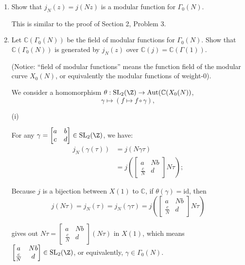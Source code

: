 \begin{enumerate}
    \item Show that $j_N(z) = j(Nz)$ is a modular function for $\Gamma_0(N)$.
    \begin{proofc}[解答]
        This is similar to the proof of Section 2, Problem 3.
    \end{proofc}

    \item Let $\mathbb{C}(\Gamma_0(N))$ be the field of modular functions for $\Gamma_0(N)$. Show that $\mathbb{C}(\Gamma_0(N))$ is generated by $j_N(z)$ over $\mathbb{C}(j) = \mathbb{C}(\Gamma(1))$.

    (Notice: ``field of modular functions'' means the function field of the modular curve $X_0(N)$, or equivalently the modular functions of weight-$0$).

     \begin{proofc}[解答]
        We consider a homomorphism $\theta: \mathrm{SL}_2(\Z) \to \mathrm{Aut}(\mathbb{C}(X_0(N))$,
        $$\gamma \mapsto (f\mapsto f \circ \gamma),$$

        (i)
        
        For any $\gamma  = \begin{bmatrix}
            a & b \\
            c & d
            \end{bmatrix} \in \mathrm{SL}_2(\Z)$, we have:
        \begin{align}
            j_N(\gamma(\tau)) &= j(N\gamma \tau) \\
            &= j(\begin{bmatrix}
                a & Nb\\
                \frac{c}{N} & d
            \end{bmatrix} N\tau);
        \end{align}

        Because $j$ is a bijection between $X(1)$ to $\mathbb{C}$, if $\theta(\gamma) = \mathrm{id}$, then
        $$j(N\tau) = j_N(\tau) = j_N(\gamma \tau) = j(\begin{bmatrix}
            a & Nb \\
            \frac{c}{N} & d
        \end{bmatrix}N\tau)$$

        gives out $N\tau = \begin{bmatrix}
            a & Nb \\
            \frac{c}{N} & d
        \end{bmatrix}(N\tau) $ in $X(1)$, which means $\begin{bmatrix}
            a & Nb\\
             \frac{c}{N} & d
        \end{bmatrix}\in \mathrm{SL}_2(\Z)$, or
        equivalently, $\gamma \in \Gamma_0(N)$.


\end{proofc}
\end{enumerate}
